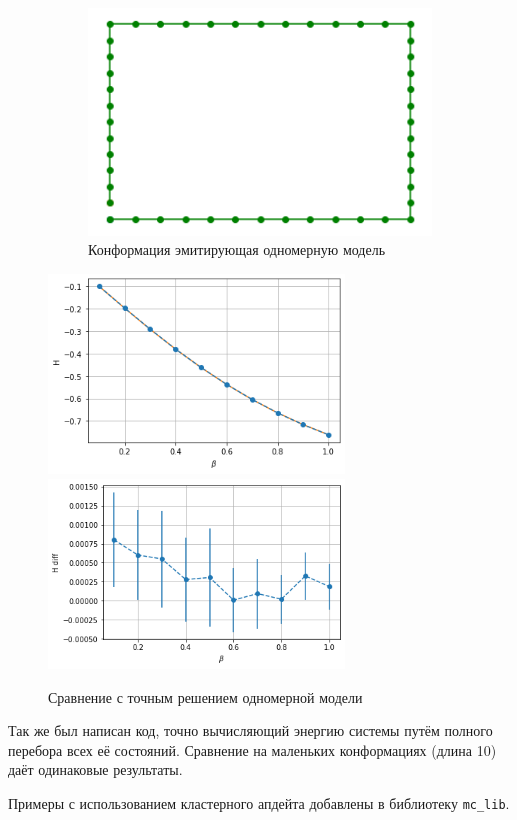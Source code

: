 \begin{figure}[H]
	\centering
	\begin{subfigure}[t]{0.7\textwidth}
		\includegraphics[width = \textwidth]{../images/1D_conf.png} 
		\caption{Конформация эмитирующая одномерную модель}
	\end{subfigure}
	\includegraphics[width = 0.7\textwidth]{../images/1D_ene.png}
	\includegraphics[width = 0.7\textwidth]{../images/1D_ene_diff.png} 
	\caption{Сравнение с точным решением одномерной модели}
\end{figure}

Так же был написан код, точно вычисляющий энергию системы путём полного перебора всех её состояний. Сравнение на маленьких конформациях (длина 10) даёт одинаковые результаты.


Примеры с использованием кластерного апдейта добавлены в библиотеку \texttt{mc\_lib}.